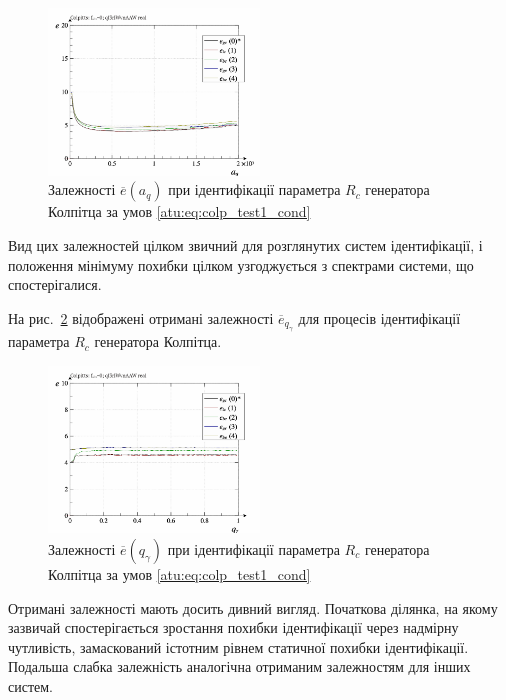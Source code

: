 \begin{figure}[htb!]
  \centerline{\includegraphics[width=0.50\textwidth]{p/r/colp_real_id-p_a_q_d_0.png} }
\caption{Залежності $ \overline{e} (a_q) $ при ідентифікації параметра $ R_c $ генератора Колпітца за умов \ref{atu:eq:colp_test1_cond}}
\label{atu:f:colp_real_id_p_a_q_d_0}
\end{figure}

Вид цих залежностей цілком звичний для розглянутих систем
ідентифікації, і положення мінімуму похибки цілком узгоджується
з спектрами системи, що спостерігалися.

На рис.~\ref{atu:f:colp_real_id_p_q_gamma_d_0} відображені отримані залежності
$ \overline{e}_{q_\gamma} $ для процесів ідентифікації параметра
$ R_c $ генератора Колпітца.

\begin{figure}[htb!]
  \centerline{\includegraphics[width=0.50\textwidth]{p/r/colp_real_id-p_q_gamma_d_0.png} }
\caption{Залежності $ \overline{e} (q_\gamma) $ при ідентифікації параметра $ R_c $ генератора Колпітца за умов \ref{atu:eq:colp_test1_cond}}
\label{atu:f:colp_real_id_p_q_gamma_d_0}
\end{figure}

Отримані залежності мають досить дивний вигляд. Початкова
ділянка, на якому зазвичай спостерігається зростання похибки
ідентифікації через надмірну чутливість, замаскований істотним
рівнем статичної похибки ідентифікації. Подальша слабка
залежність аналогічна отриманим залежностям для інших систем.

